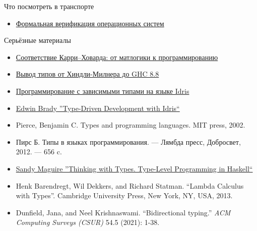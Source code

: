     \begin{frame}{Что посмотреть в транспорте}
        \begin{itemize}
            \item \href{https://youtu.be/f12hIDF0XPc}{\color{blue} Формальная верификация операционных систем}
        \end{itemize}
    \end{frame}

    \begin{frame}{Серьёзные материалы}
        \begin{itemize}
            \item \href{https://www.mccme.ru/dubna/2017/courses/bragilevsky.html}{\color{blue} Соответствие Карри–Ховарда: от матлогики к программированию}
            \item \href{https://www.youtube.com/watch?v=_HYI7zjkrEs&list=PLvPsfYrGz3wuVAGhNf6-i7uafXg56oqM5}{\color{blue} Вывод типов от Хиндли-Милнера до GHC 8.8}
            \item \href{https://youtu.be/o-7zhrUP3ds}{\color{blue} Программирование с зависимыми типами на языке Idris}
            \item \href{https://www.amazon.com/Type-driven-Development-Idris-Edwin-Brady/dp/1617293024}{\color{blue} Edwin Brady ''Type-Driven Development with Idris``}
            \item Pierce, Benjamin C. Types and programming languages. MIT press, 2002.
            \item Пирс Б. Типы в языках программирования. — Лямбда пресс, Добросвет, 2012. — 656 c.
            \item \href{https://thinkingwithtypes.com/}{\color{blue} Sandy Maguire ''Thinking with Types. Type-Level Programming in Haskell``}
            \item Henk Barendregt, Wil Dekkers, and Richard Statman. ``Lambda Calculus with Types''. Cambridge University Press, New York, NY, USA, 2013.
            \item Dunfield, Jana, and Neel Krishnaswami. ``Bidirectional typing.'' \textit{ACM Computing Surveys (CSUR)} 54.5 (2021): 1-38.
        \end{itemize}
    \end{frame}


